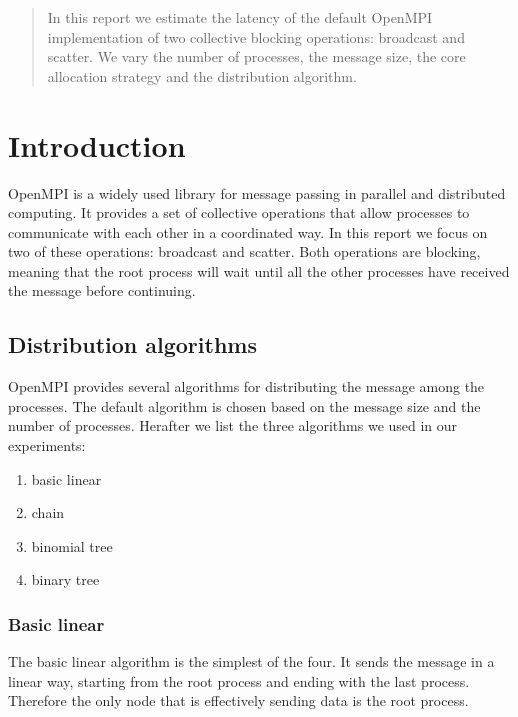 %
%
\begin{abstract}
    In this report we estimate the latency of the default OpenMPI
    implementation of two collective blocking operations: broadcast
    and scatter. We vary the number of processes, the message size,    
    the core allocation strategy and the distribution algorithm.
\end{abstract}

\maketitle

\section{Introduction}
    OpenMPI is a widely used library for message passing in parallel
    and distributed computing. It provides a set of collective operations
    that allow processes to communicate with each other in a coordinated
    way. In this report we focus on two of these operations: broadcast
    and scatter. Both operations are blocking, meaning that the root
    process will wait until all the other processes have received the
    message before continuing.


\subsection{Distribution algorithms}
    OpenMPI provides several algorithms for distributing the message
    among the processes. The default algorithm is chosen based on the
    message size and the number of processes. Herafter we list the three
    algorithms we used in our experiments:
    \begin{enumerate}
        \item basic linear
        \item chain
        \item binomial tree
        \item binary tree
    \end{enumerate}
\subsubsection{Basic linear}
    The basic linear algorithm is the simplest of the four. It sends
    the message in a linear way, starting from the root process
    and ending with the last process. Therefore the only node that
    is effectively sending data is the root process.

